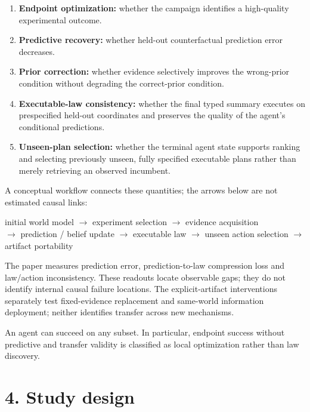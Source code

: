 \documentclass[10pt,twocolumn]{article}
\providecommand{\tightlist}{%
  \setlength{\itemsep}{0pt}\setlength{\parskip}{0pt}}
\begin{document}
\begin{enumerate}
\def\labelenumi{\arabic{enumi}.}
\tightlist
\item
  \textbf{Endpoint optimization:} whether the campaign identifies a
  high-quality experimental outcome.
\item
  \textbf{Predictive recovery:} whether held-out counterfactual
  prediction error decreases.
\item
  \textbf{Prior correction:} whether evidence selectively improves the
  wrong-prior condition without degrading the correct-prior condition.
\item
  \textbf{Executable-law consistency:} whether the final typed summary
  executes on prespecified held-out coordinates and preserves the
  quality of the agent's conditional predictions.
\item
  \textbf{Unseen-plan selection:} whether the terminal agent state
  supports ranking and selecting previously unseen, fully specified
  executable plans rather than merely retrieving an observed incumbent.
\end{enumerate}

A conceptual workflow connects these quantities; the arrows below are
not estimated causal links:

\begin{center}
\small initial world model $\rightarrow$ experiment selection $\rightarrow$ evidence acquisition\\
$\rightarrow$ prediction / belief update $\rightarrow$ executable law $\rightarrow$ unseen action selection $\rightarrow$ artifact portability
\end{center}

The paper measures prediction error, prediction-to-law compression loss
and law/action inconsistency. These readouts locate observable gaps;
they do not identify internal causal failure locations. The
explicit-artifact interventions separately test fixed-evidence
replacement and same-world information deployment; neither identifies
transfer across new mechanisms.

An agent can succeed on any subset. In particular, endpoint success
without predictive and transfer validity is classified as local
optimization rather than law discovery.

\section{4. Study design}\label{study-design}
\end{document}
